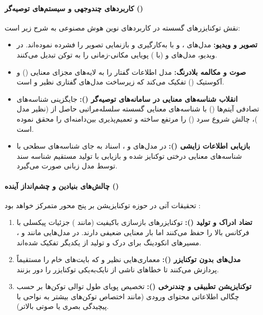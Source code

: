 \paragraph*{کاربردهای چندوجهی و سیستم‌های توصیه‌گر ()}
نقش توکنایزرهای گسسته در کاربردهای نوین هوش مصنوعی به شرح زیر است:
\begin{itemize}
    \item \textbf{تصویر و ویدیو:} مدل‌های  \cite{yu2024an}،  و  با به‌کارگیری  و  بازنمایی تصویر را فشرده نموده‌اند. در ویدیو، مدل‌های  \cite{yu2024language} و  (با ) پویایی مکانی-زمانی را به توکن تبدیل می‌کنند.
    \item \textbf{صوت و مکالمه بلادرنگ:} مدل  \cite{zhang2024speechtokenizer} اطلاعات گفتار را به لایه‌های مجزای معنایی () و آکوستیک () تفکیک می‌کند که زیرساخت مدل‌های گفتاری نظیر  و  است.
    \item \textbf{انقلاب شناسه‌های معنایی در سامانه‌های توصیه‌گر ():} جایگزینی شناسه‌های تصادفی آیتم‌ها () با شناسه‌های معنایی گسسته سلسله‌مراتبی حاصل از  (نظیر مدل  \cite{rajput2023recommender})، چالش شروع سرد () را مرتفع ساخته و تعمیم‌پذیری بین‌دامنه‌ای را محقق نموده است.
    \item \textbf{بازیابی اطلاعات زایشی ():} در مدل‌های  \cite{tay2022transformer} و ، اسناد به جای شناسه‌های سطحی با شناسه‌های معنایی درختی توکنایز شده و بازیابی با تولید مستقیم شناسه سند توسط مدل زبانی صورت می‌گیرد.
\end{itemize}

\paragraph*{چالش‌های بنیادین و چشم‌انداز آینده ()}
تحقیقات آتی در حوزه توکنایزیشن بر پنج محور متمرکز خواهد بود \cite{gastaldi2025foundations, li2025discrete, jia2025principles}:
\begin{enumerate}
    \item \textbf{تضاد ادراک و تولید ():} توکنایزرهای بازسازی باکیفیت (مانند ) جزئیات پیکسلی با فرکانس بالا را حفظ می‌کنند اما بار معنایی ضعیفی دارند. در مدل‌هایی مانند  و  \cite{chen2025janus}، مسیرهای انکودینگ برای درک و تولید از یکدیگر تفکیک شده‌اند.
    \item \textbf{مدل‌های بدون توکنایزر ():} معماری‌هایی نظیر  \cite{pagnoni2024byte} و  که بایت‌های خام را مستقیماً پردازش می‌کنند تا خطاهای ناشی از نایک‌به‌یکی توکنایزر را دور بزنند.
    \item \textbf{توکنایزیشن تطبیقی و چندنرخی ():} تخصیص پویای طول توالی توکن‌ها بر حسب چگالی اطلاعاتی محتوای ورودی (مانند اختصاص توکن‌های بیشتر به نواحی با پیچیدگی بصری یا صوتی بالاتر).
\end{enumerate}